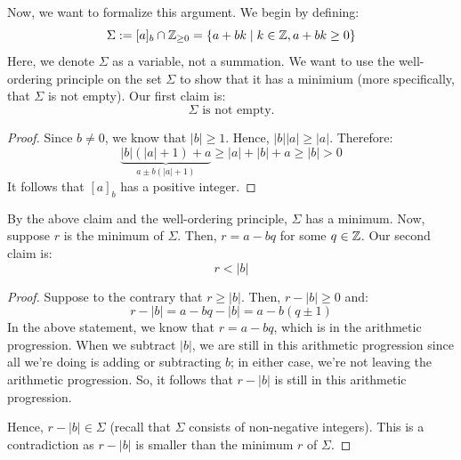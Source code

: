 \documentclass[letterpaper]{article}
\begin{document}
Now, we want to formalize this argument. We begin by defining: 
\[\Sigma := [a]_b \cap \mathbb{Z}_{\geq 0} = \{a + bk \mid k \in \mathbb{Z}, a + bk \geq 0\}\]
Here, we denote $\Sigma$ as a variable, not a summation. We want to use the well-ordering principle on the set $\Sigma$ to show that it has a minimium (more specifically, that $\Sigma$ is not empty). Our first claim is:
\[\Sigma \text{ is not empty.}\]
\begin{framed}
    \begin{proof}
        Since $b \neq 0$, we know that $|b| \geq 1$. Hence, $|b||a| \geq |a|$. Therefore:
        \[\underbrace{|b|(|a| + 1) + a}_{a \pm b(|a| + 1)} \geq |a| + |b| + a \geq |b| > 0\]
        It follows that $[a]_b$ has a positive integer. 
    \end{proof}
\end{framed}
By the above claim and the well-ordering principle, $\Sigma$ has a minimum. Now, suppose $r$ is the minimum of $\Sigma$. Then, $r = a - bq$ for some $q \in \mathbb{Z}$. Our second claim is:
\[r < |b|\]
\begin{framed}
    \begin{proof}
        Suppose to the contrary that $r \geq |b|$. Then, $r - |b| \geq 0$ and:
        \[r - |b| = a - bq - |b| = a - b(q \pm 1)\]
        In the above statement, we know that $r = a - bq$, which is in the arithmetic progression. When we subtract $|b|$, we are still in this arithmetic progression since all we're doing is adding or subtracting $b$; in either case, we're not leaving the arithmetic progression. So, it follows that $r - |b|$ is still in this arithmetic progression.
    
        \bigskip 
    
        Hence, $r - |b| \in \Sigma$ (recall that $\Sigma$ consists of non-negative integers). This is a contradiction as $r - |b|$ is smaller than the minimum $r$ of $\Sigma$. 
    \end{proof}
\end{framed}
\end{document}
